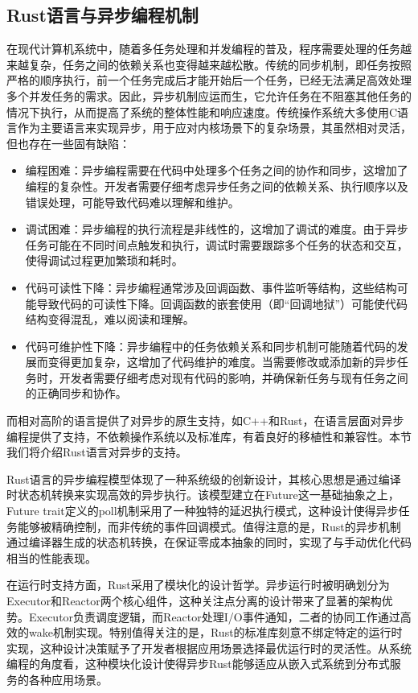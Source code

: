 \subsection{Rust语言与异步编程机制}
在现代计算机系统中，随着多任务处理和并发编程的普及，程序需要处理的任务越来越复杂，任务之间的依赖关系也变得越来越松散。传统的同步机制，即任务按照严格的顺序执行，前一个任务完成后才能开始后一个任务，已经无法满足高效处理多个并发任务的需求。因此，异步机制应运而生，它允许任务在不阻塞其他任务的情况下执行，从而提高了系统的整体性能和响应速度。传统操作系统大多使用C语言作为主要语言来实现异步，用于应对内核场景下的复杂场景，其虽然相对灵活，但也存在一些固有缺陷：
\begin{itemize}
    \item 编程困难：异步编程需要在代码中处理多个任务之间的协作和同步，这增加了编程的复杂性。开发者需要仔细考虑异步任务之间的依赖关系、执行顺序以及错误处理，可能导致代码难以理解和维护。
    \item 调试困难：异步编程的执行流程是非线性的，这增加了调试的难度。由于异步任务可能在不同时间点触发和执行，调试时需要跟踪多个任务的状态和交互，使得调试过程更加繁琐和耗时。
    \item 代码可读性下降：异步编程通常涉及回调函数、事件监听等结构，这些结构可能导致代码的可读性下降。回调函数的嵌套使用（即“回调地狱”）可能使代码结构变得混乱，难以阅读和理解。
    \item 代码可维护性下降：异步编程中的任务依赖关系和同步机制可能随着代码的发展而变得更加复杂，这增加了代码维护的难度。当需要修改或添加新的异步任务时，开发者需要仔细考虑对现有代码的影响，并确保新任务与现有任务之间的正确同步和协作。
  \end{itemize}

而相对高阶的语言提供了对异步的原生支持，如C++和Rust，在语言层面对异步编程提供了支持，不依赖操作系统以及标准库，有着良好的移植性和兼容性。本节我们将介绍Rust语言对异步的支持。

Rust语言的异步编程模型体现了一种系统级的创新设计，其核心思想是通过编译时状态机转换来实现高效的异步执行。该模型建立在Future这一基础抽象之上，Future trait定义的poll机制采用了一种独特的延迟执行模式，这种设计使得异步任务能够被精确控制，而非传统的事件回调模式。值得注意的是，Rust的异步机制通过编译器生成的状态机转换，在保证零成本抽象的同时，实现了与手动优化代码相当的性能表现。

在运行时支持方面，Rust采用了模块化的设计哲学。异步运行时被明确划分为Executor和Reactor两个核心组件，这种关注点分离的设计带来了显著的架构优势。Executor负责调度逻辑，而Reactor处理I/O事件通知，二者的协同工作通过高效的wake机制实现。特别值得关注的是，Rust的标准库刻意不绑定特定的运行时实现，这种设计决策赋予了开发者根据应用场景选择最优运行时的灵活性。从系统编程的角度看，这种模块化设计使得异步Rust能够适应从嵌入式系统到分布式服务的各种应用场景。

